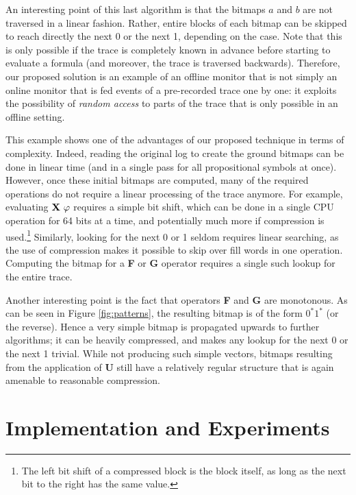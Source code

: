 An interesting point of this last algorithm is that the bitmaps $a$ and $b$ are not traversed in a linear fashion. Rather, entire blocks of each bitmap can be skipped to reach directly the next 0 or the next 1, depending on the case. Note that this is only possible if the trace is completely known in advance before starting to evaluate a formula (and moreover, the trace is traversed backwards). Therefore, our proposed solution is an example of an offline monitor that is not simply an online monitor that is fed events of a pre-recorded trace one by one: it exploits the possibility of \emph{random access} to parts of the trace that is only possible in an offline setting.

This example shows one of the advantages of our proposed technique in terms of complexity. Indeed, reading the original log to create the ground bitmaps can be done in linear time (and in a single pass for all propositional symbols at once). However, once these initial bitmaps are computed, many of the required operations do not require a linear processing of the trace anymore. For example, evaluating $\mathop{\mbox{\textbf{X}}}\,\varphi$ requires a simple bit shift, which can be done in a single CPU operation for 64 bits at a time, and potentially much more if compression is used.\footnote{The left bit shift of a compressed block is the block itself, as long as the next bit to the right has the same value.} Similarly, looking for the next 0 or 1 seldom requires linear searching, as the use of compression makes it possible to skip over fill words in one operation. Computing the bitmap for a \textbf{F} or \textbf{G} operator requires a single such lookup for the entire trace.

Another interesting point is the fact that operators \textbf{F} and \textbf{G} are monotonous. As can be seen in Figure \ref{fig:patterns}, the resulting bitmap is of the form $0^*1^*$ (or the reverse). Hence a very simple bitmap is propagated upwards to further algorithms; it can be heavily compressed, and makes any lookup for the next 0 or the next 1 trivial. While not producing such simple vectors, bitmaps resulting from the application of \textbf{U} still have a relatively regular structure that is again amenable to reasonable compression.



\section{Implementation and Experiments}\label{sec:bm:experiments} %

